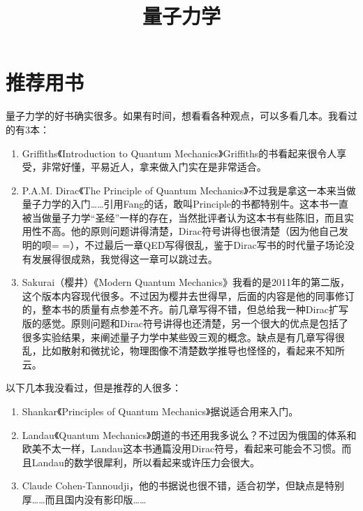 \documentclass{ctexart}
\begin{document}
\title{量子力学}
\maketitle
\tableofcontents
\section{推荐用书}

量子力学的好书确实很多。如果有时间，想看看各种观点，可以多看几本。我看过的有3本：

\begin{enumerate}
\item Griffiths《Introduction to Quantum Mechanics》Griffiths的书看起来很令人享受，非常好懂，平易近人，拿来做入门实在是非常适合。

\item P.A.M. Dirac《The Principle of Quantum Mechanics》不过我是拿这一本来当做量子力学的入门……引用Fang的话，敢叫Principle的书都特别牛。这本书一直被当做量子力学“圣经”一样的存在，当然批评者认为这本书有些陈旧，而且实用性不高。他的原则问题讲得清楚，Dirac符号讲得也很清楚（因为他自己发明的呗= =），不过最后一章QED写得很乱，鉴于Dirac写书的时代量子场论没有发展得很成熟，我觉得这一章可以跳过去。

\item Sakurai（樱井）《Modern Quantum Mechanics》我看的是2011年的第二版，这个版本内容现代很多。不过因为樱井去世得早，后面的内容是他的同事修订的，整本书的质量有点参差不齐。前几章写得不错，但总给我一种Dirac扩写版的感觉。原则问题和Dirac符号讲得也还清楚，另一个很大的优点是包括了很多实验结果，来阐述量子力学中某些毁三观的概念。缺点是有几章写得很乱，比如散射和微扰论，物理图像不清楚数学推导也怪怪的，看起来不知所云。
\end{enumerate}

以下几本我没看过，但是推荐的人很多：

\begin{enumerate}
\item Shankar《Principles of Quantum Mechanics》据说适合用来入门。

\item Landau《Quantum Mechanics》朗道的书还用我多说么？不过因为俄国的体系和欧美不太一样，Landau这本书通篇没用Dirac符号，看起来可能会不习惯。而且Landau的数学很犀利，所以看起来或许压力会很大。

\item Claude Cohen-Tannoudji，他的书据说也很不错，适合初学，但缺点是特别厚……而且国内没有影印版……
\end{enumerate}
\end{document}
